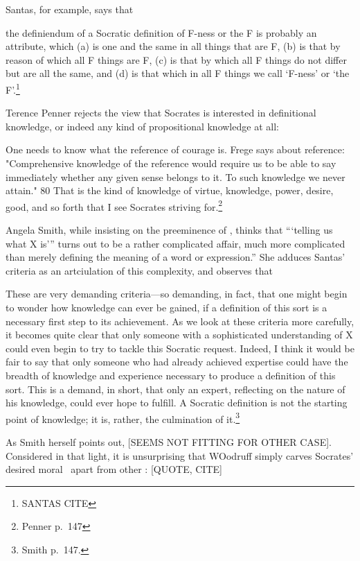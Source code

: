 \documentclass[11pt,letterpaper,oneside]{amsart} %
\begin{document}
Santas, for example, says that\begin{squote}the definiendum of a Socratic definition of F-ness or the F is probably an attribute, which (a) is one and the same in all things that are F, (b) is that by reason of which all F things are F, (c) is that by which all F things do not differ but are all the same, and (d) is that which in all F things we call `F-ness' or `the F'.\footnote{SANTAS CITE}\end{squote}Terence Penner rejects the view that Socrates is interested in definitional knowledge, or indeed any kind of propositional knowledge at all:\begin{squote}One needs to know what the reference of courage is. Frege says about reference: "Comprehensive knowledge of the reference would require us to be able to say immediately whether any given sense belongs to it. To such knowledge we never attain." 80 That is the kind of knowledge of virtue, knowledge, power, desire, good, and so forth that I see Socrates striving for.\footnote{Penner p.\ 147}\end{squote} Angela Smith, while insisting on the preeminence of \techne, thinks that ``{`}telling us what X is'{''} turns out to be a rather complicated affair, much more complicated than merely defining the meaning of a word or expression.'' She adduces Santas' criteria as an artciulation of this complexity, and observes that\begin{squote}These are very demanding criteria---so demanding, in fact, that one might begin to wonder how knowledge can ever be gained, if a definition of this sort is a necessary first step to its achievement. As we look at these criteria more carefully, it becomes quite clear that only someone with a  sophisticated understanding of X could even begin to try to tackle this Socratic request. Indeed, I think it would be fair to say that only someone who had already achieved expertise could have the breadth of knowledge and experience necessary to produce a definition of this sort. This is a demand, in short, that only an expert, reflecting on the nature of his knowledge, could ever hope to fulfill. A Socratic definition is not the starting point of knowledge; it is, rather, the culmination of it.\footnote{Smith p.\ 147.}\end{squote} As Smith herself points out, [SEEMS NOT FITTING FOR OTHER CASE]. Considered in that light, it is unsurprising that WOodruff simply carves Socrates' desired moral \techne\ apart from other \techne: [QUOTE, CITE]
\end{document}
